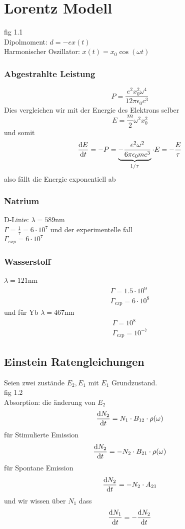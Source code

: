 \section{Lorentz Modell}

fig 1.1\\
Dipolmoment: $d = -ex(t)$\\
Harmonischer Oszillator: $x(t) = x_0 \cos(\omega t)$

\subsubsection{Abgestrahlte Leistung}
$$
P = \frac{e^2 x_0^2 \omega^4}{12\pi\epsilon_0 c^3}
$$
Dies vergleichen wir mit der Energie des Elektrons selber
$$
E = \frac{m}{2}\omega^2 x_0^2
$$
und somit
$$
\frac{\text dE}{\text dt} = -P = \underbrace{-\frac{e^2\omega^2}{6\pi\epsilon_0 mc^3}}_{1/\tau}\cdot E = -\frac{E}{\tau}
$$
also fällt die Energie exponentiell ab

\subsubsection{Natrium}
D-Linie: $\lambda = 589$nm\\
$\Gamma = \frac{1}{\tau} = 6\cdot 10^{7}$ und der experimentelle fall\\
$\Gamma_{exp} = 6\cdot 10^{7}$
\subsubsection{Wasserstoff}
$\lambda = 121$nm
\begin{gather*}
	\Gamma = 1.5\cdot10^{9}\\
	\Gamma_{exp} = 6\cdot10^{8}
\end{gather*}
und für Yb $\lambda = 467$nm
\begin{gather*}
	\Gamma = 10^{8}\\
	\Gamma_{exp} = 10^{-7}
\end{gather*}

\subsection{Einstein Ratengleichungen}

Seien zwei zustände $E_2, E_1$ mit $E_1$ Grundzustand.\\
fig 1.2\\

Absorption: die änderung von $E_2$
$$
\frac{\text dN_2}{\text d t} = N_1\cdot B_{12} \cdot \rho(\omega)
$$
für Stimulierte Emission
$$
\frac{\text dN_2}{\text dt} = -N_2\cdot B_{21}\cdot\rho(\omega)
$$
für Spontane Emission
$$
\frac{\text dN_2}{\text dt} = -N_2\cdot A_{21}
$$
und wir wissen über $N_1$ dass
$$
\frac{\text dN_1}{\text dt} = -\frac{\text dN_2}{\text dt}
$$


